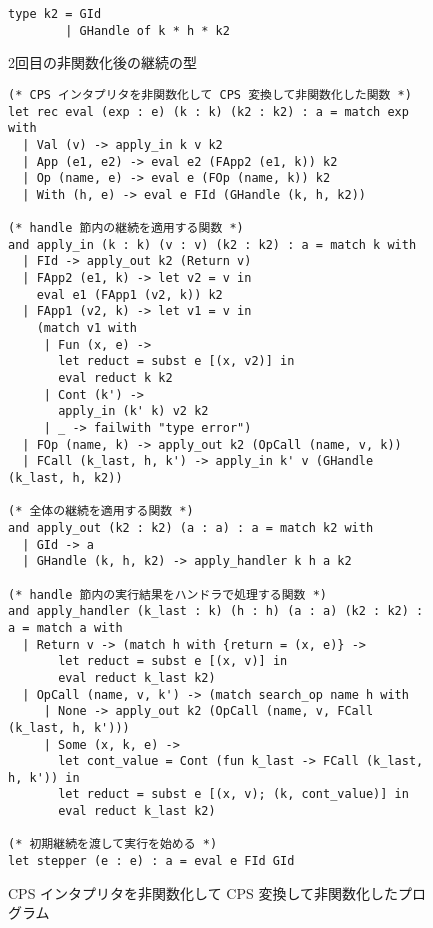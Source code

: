 
\begin{figure}
\begin{verbatim}
type k2 = GId
        | GHandle of k * h * k2
\end{verbatim}
\caption{2回目の非関数化後の継続の型}
\label{figure:k2_4defun}
\end{figure}

\begin{figure}
\begin{verbatim}
(* CPS インタプリタを非関数化して CPS 変換して非関数化した関数 *)
let rec eval (exp : e) (k : k) (k2 : k2) : a = match exp with
  | Val (v) -> apply_in k v k2
  | App (e1, e2) -> eval e2 (FApp2 (e1, k)) k2
  | Op (name, e) -> eval e (FOp (name, k)) k2
  | With (h, e) -> eval e FId (GHandle (k, h, k2))

(* handle 節内の継続を適用する関数 *)
and apply_in (k : k) (v : v) (k2 : k2) : a = match k with
  | FId -> apply_out k2 (Return v)
  | FApp2 (e1, k) -> let v2 = v in
    eval e1 (FApp1 (v2, k)) k2
  | FApp1 (v2, k) -> let v1 = v in
    (match v1 with
     | Fun (x, e) ->
       let reduct = subst e [(x, v2)] in
       eval reduct k k2
     | Cont (k') ->
       apply_in (k' k) v2 k2
     | _ -> failwith "type error")
  | FOp (name, k) -> apply_out k2 (OpCall (name, v, k))
  | FCall (k_last, h, k') -> apply_in k' v (GHandle (k_last, h, k2))

(* 全体の継続を適用する関数 *)
and apply_out (k2 : k2) (a : a) : a = match k2 with
  | GId -> a
  | GHandle (k, h, k2) -> apply_handler k h a k2

(* handle 節内の実行結果をハンドラで処理する関数 *)
and apply_handler (k_last : k) (h : h) (a : a) (k2 : k2) : a = match a with
  | Return v -> (match h with {return = (x, e)} ->
       let reduct = subst e [(x, v)] in
       eval reduct k_last k2)
  | OpCall (name, v, k') -> (match search_op name h with
     | None -> apply_out k2 (OpCall (name, v, FCall (k_last, h, k')))
     | Some (x, k, e) ->
       let cont_value = Cont (fun k_last -> FCall (k_last, h, k')) in
       let reduct = subst e [(x, v); (k, cont_value)] in
       eval reduct k_last k2)

(* 初期継続を渡して実行を始める *)
let stepper (e : e) : a = eval e FId GId
\end{verbatim}
\caption{CPS インタプリタを非関数化して CPS 変換して非関数化したプログラム}
\label{figure:4defun}
\end{figure}

